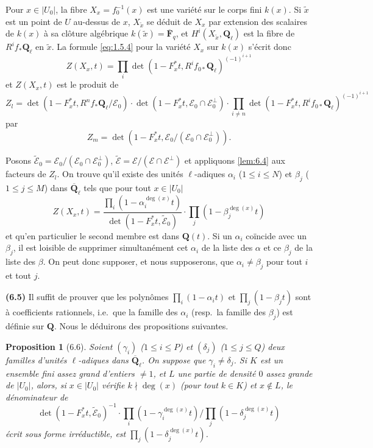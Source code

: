 \documentclass[12pt,a4paper]{amsart}
\theoremstyle{plain}
\newtheorem{proposition}[theoreme]{Proposition}
\theoremstyle{definition}
\theoremstyle{remark}
\newcommand{\Q}{\mathbf{Q}}
\newcommand{\F}{\mathbf{F}}
\numberwithin{equation}{section}
\begin{document}
Pour $x\in|U_0|$, la fibre $X_x=f_0^{-1}(x)$ est une vari\'et\'e sur le corps fini $k(x)$. Si $\tilde{x}$ est un point de $U$ au-dessus de $x$, $X_{\tilde{x}}$ se d\'eduit de $X_x$ par extension des scalaires de $k(x)$ \`a sa cl\^oture alg\'ebrique $k(\tilde{x})=\overline{\F}_q$, et $H^i(X_{\tilde{x}},\Q_\ell)$ est la fibre de $R^i f_\ast\Q_\ell$ en $\tilde{x}$. La formule \eqref{eq:1.5.4} pour la vari\'et\'e $X_x$ sur $k(x)$ s'\'ecrit donc
\[
Z(X_x,t) = \prod_i \det(1-F_x^\ast t, R^i f_{0\ast}\Q_\ell)^{(-1)^{i+1}}
\]
et $Z(X_x,t)$ est le produit de
\[
Z_l = \det(1-F_x^\ast t, R^n f_\ast\Q_\ell/\mathscr{E}_0) \cdot \det(1-F_x^\ast t, \mathscr{E}_0\cap\mathscr{E}_0^\perp) \cdot \prod_{i\not=n} \det(1-F_x^\ast t, R^i f_{0\ast}\Q_\ell)^{(-1)^{i+1}}
\]
par
\[
Z_m = \det(1-F_x^\ast t, \mathscr{E}_0/(\mathscr{E}_0\cap\mathscr{E}_0^\perp)).
\]

Posons $\widetilde{\mathscr{E}}_0 = \mathscr{E}_0/(\mathscr{E}_0\cap\mathscr{E}_0^\perp)$, $\widetilde{\mathscr{E}} = \mathscr{E}/(\mathscr{E}\cap\mathscr{E}^\perp)$ et appliquons \eqref{lem:6.4} aux facteurs de $Z_l$. On trouve qu'il existe des unit\'es $\ell$-adiques $\alpha_i$ ($1\le i\le N$) et $\beta_j$ ($1\le j\le M$) dans $\overline{\Q}_\ell$ tels que pour tout $x\in|U_0|$
\[
Z(X_x,t) = \frac{\prod_i(1-\alpha_i^{\deg(x)} t)}{\det(1-F_x^\ast t, \widetilde{\mathscr{E}}_0)} \cdot \prod_j (1-\beta_j^{\deg(x)} t)
\]
et qu'en particulier le second membre est dans $\Q(t)$. Si un $\alpha_i$ co\"incide avec un $\beta_j$, il est loisible de supprimer simultan\'ement cet $\alpha_i$ de la liste des $\alpha$ et ce $\beta_j$ de la liste des $\beta$. On peut donc supposer, et nous supposerons, que $\alpha_i\not=\beta_j$ pour tout $i$ et tout $j$.

\noindent \textbf{(6.5)} Il suffit de prouver que les polyn\^omes $\prod_i(1-\alpha_i t)$ et $\prod_j(1-\beta_j t)$ sont \`a coefficients rationnels, i.e.\ que la famille des $\alpha_i$ (resp.\ la famille des $\beta_j$) est d\'efinie sur $\Q$. Nous le d\'eduirons des propositions suivantes.

\begin{proposition}[6.6]\label{prop:6.6}
Soient $(\gamma_i)$ ($1\le i\le P$) et $(\delta_j)$ ($1\le j\le Q$) deux familles d'unit\'es $\ell$-adiques dans $\overline{\Q}_\ell$. On suppose que $\gamma_i\not=\delta_j$. Si $K$ est un ensemble fini assez grand d'entiers $\not=1$, et $L$ une partie de densit\'e $0$ assez grande de $|U_0|$, alors, si $x\in|U_0|$ v\'erifie $k\nmid\deg(x)$ (pour tout $k\in K$) et $x\not\in L$, le d\'enominateur de
\begin{equation}\label{eq:6.6.1}
\det(1-F_x^\ast t, \widetilde{\mathscr{E}}_0)^{-1} \cdot \prod_i(1-\gamma_i^{\deg(x)} t) \Big/ \prod_j(1-\delta_j^{\deg(x)} t)
\end{equation}
\'ecrit sous forme irr\'eductible, est $\prod_j(1-\delta_j^{\deg(x)} t)$.
\end{proposition}
\end{document}
